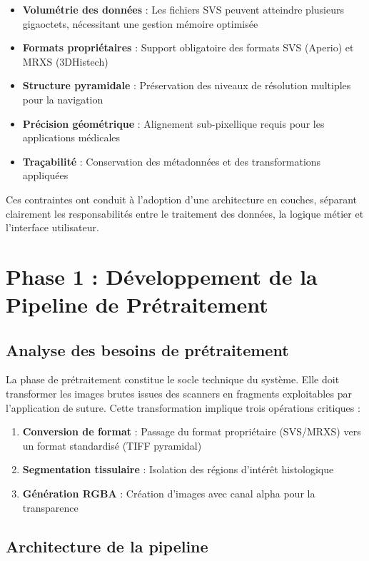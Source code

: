 \documentclass[12pt,a4paper]{report}
\begin{document}
\begin{itemize}
    \item \textbf{Volumétrie des données} : Les fichiers SVS peuvent atteindre plusieurs gigaoctets, nécessitant une gestion mémoire optimisée
    \item \textbf{Formats propriétaires} : Support obligatoire des formats SVS (Aperio) et MRXS (3DHistech)
    \item \textbf{Structure pyramidale} : Préservation des niveaux de résolution multiples pour la navigation
    \item \textbf{Précision géométrique} : Alignement sub-pixellique requis pour les applications médicales
    \item \textbf{Traçabilité} : Conservation des métadonnées et des transformations appliquées
\end{itemize}

Ces contraintes ont conduit à l'adoption d'une architecture en couches, séparant clairement les responsabilités entre le traitement des données, la logique métier et l'interface utilisateur.

\section{Phase 1 : Développement de la Pipeline de Prétraitement}

\subsection{Analyse des besoins de prétraitement}

La phase de prétraitement constitue le socle technique du système. Elle doit transformer les images brutes issues des scanners en fragments exploitables par l'application de suture. Cette transformation implique trois opérations critiques :

\begin{enumerate}
    \item \textbf{Conversion de format} : Passage du format propriétaire (SVS/MRXS) vers un format standardisé (TIFF pyramidal)
    \item \textbf{Segmentation tissulaire} : Isolation des régions d'intérêt histologique
    \item \textbf{Génération RGBA} : Création d'images avec canal alpha pour la transparence
\end{enumerate}

\subsection{Architecture de la pipeline}
\end{document}
